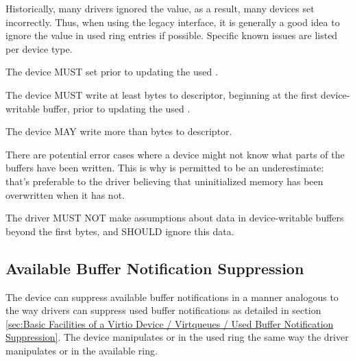 Historically, many drivers ignored the  value, as a
result, many devices set  incorrectly.  Thus, when
using the legacy interface, it is generally a good idea to ignore
the  value in used ring entries if possible.  Specific
known issues are listed per device type.


The device MUST set  prior to updating the used .

The device MUST write at least  bytes to descriptor,
beginning at the first device-writable buffer,
prior to updating the used .

The device MAY write more than  bytes to descriptor.

\begin{note}
There are potential error cases where a device might not know what
parts of the buffers have been written.  This is why  is
permitted to be an underestimate: that's preferable to the driver believing
that uninitialized memory has been overwritten when it has not.
\end{note}


The driver MUST NOT make assumptions about data in device-writable buffers
beyond the first  bytes, and SHOULD ignore this data.

\subsection{Available Buffer Notification Suppression}\label{sec:Basic Facilities of a Virtio Device / Virtqueues / Virtqueue Notification Suppression}

The device can suppress available buffer notifications in a manner
analogous to the way drivers can suppress used buffer notifications as
detailed in section \ref{sec:Basic Facilities of a Virtio Device /
Virtqueues / Used Buffer Notification Suppression}.
The device manipulates  or  in the used ring the
same way the driver manipulates  or  in the available ring.

